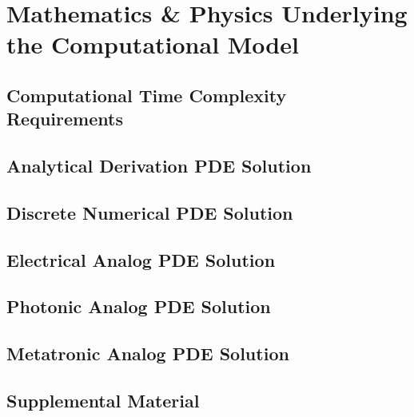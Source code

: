 \chapter{Mathematics \& Physics Underlying the Computational Model}

%


\section{Computational Time Complexity Requirements}\label{bigO}



\section{Analytical Derivation PDE Solution}\label{analyticalPDE}



\section{Discrete Numerical PDE Solution}\label{numericalPDE}



\section{Electrical Analog PDE Solution}\label{electricalPDE}



\section{Photonic Analog PDE Solution}\label{photonicPDE}



\section{Metatronic Analog PDE Solution}\label{metatronicPDE}




\section{Supplemental Material}





%



